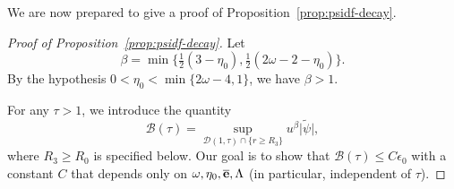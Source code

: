 \documentclass[10pt, reqno]{amsart}
\theoremstyle{definition}
\theoremstyle{remark}
\theoremstyle{conjecture}
\numberwithin{equation}{section}
\newcommand{\abs}[1]{\vert#1\vert}
\newcommand{\set}[1]{\{#1\}}
\newcommand{\0}{\emptyset}
\newcommand{\bt}{\beta}
\newcommand{\eps}{\epsilon}
\newcommand{\Lmb}{\Lambda}
\newcommand{\omg}{\omega}
\newcommand{\bfe}{{\bf e}}
\newcommand{\calB}{\mathcal B}
\newcommand{\calD}{\mathcal D}
\newcommand{\e}{\bfe}							%
\newcommand{\psibg}{\overline{\psi}}				%
\newcommand{\ebg}{\overline{\e}}					%
\newcommand{\psidf}{\widetilde{\psi}}				%
\begin{document}
We are now prepared to give a proof of Proposition~\ref{prop:psidf-decay}.
\begin{proof}[Proof of Proposition~\ref{prop:psidf-decay}]
Let
\begin{equation} \label{eq:psidf-decay-bt}
	\bt = \min \set{\tfrac{1}{2}(3 - \eta_{0}), \tfrac{1}{2}(2 \omg - 2 -  \eta_{0})}.
\end{equation}
By the hypothesis $0 < \eta_{0} < \min \set{2 \omg - 4, 1}$, we have $\bt > 1$.

For any $\tau > 1$, we introduce the quantity
\begin{equation*}
	\calB(\tau) = \sup_{\calD(1, \tau) \cap \set{r \geq R_{3}}} u^{\bt} \abs{\psidf},
\end{equation*}
where $R_{3} \geq R_{0}$ is specified below. Our goal is to show that $\calB(\tau) \leq C \eps_{0}$ with a constant $C$ that depends only on $\omg, \eta_{0}, \ebg, \Lmb$ (in particular, independent of $\tau$).


\end{proof}
\end{document}
